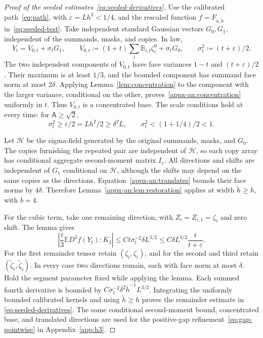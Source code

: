 \documentclass[11pt,letterpaper]{article}
\theoremstyle{remark}
\newcommand{\E}{\mathbb E}
\begin{document}
\begin{proof}[Proof of the seeded estimates~\eqref{eq:seeded-derivatives}]
Use the calibrated path~\eqref{eq:path}, with
\(\varepsilon=Lh^2<1/4\), and the rescaled function
\(f=F_{\widetilde a,\widetilde h}\) in~\eqref{eq:seeded-test}.
Take independent standard Gaussian vectors \(G_0,G_1\), independent
of the summands, masks, and copies. In law,
\begin{equation}
 Y_t=V_{0,t}+\sigma_tG_1,\qquad
 V_{0,t}\coloneqq(1+t)\sum_i\mathbb B_{i,t}\zeta_i^0+\sigma_tG_0,
 \qquad\sigma_t^2\coloneqq(t+\varepsilon)/2.
 \label{eq:seeded-gaussian-split}
\end{equation}
The two independent components of \(V_{0,t}\) have face variances
\(1-t\) and \((t+\varepsilon)/2\). Their maximum is at least
\(1/3\), and the bounded component has summand face norm at most
\(2\delta\). Applying Lemma~\ref{lem:concentration} to the
component with the larger variance, conditional on the other,
proves~\eqref{appx-an:concentration} uniformly in \(t\).
Thus \(V_{0,t}\) is a concentrated base. The scale conditions hold
at every time: for \(\mathsf A\ge\sqrt2\),
\[
 \sigma_t^2\ge\varepsilon/2=Lh^2/2\ge\delta^2L,
 \qquad \sigma_t^2<(1+1/4)/2<1.
\]

Let \(\mathcal H\) be the sigma-field generated by the original
summands, masks, and \(G_0\). The copies furnishing the repeated
pair are independent of \(\mathcal H\), so each copy array has
conditional aggregate second-moment matrix \(I_r\). All directions
and shifts are independent of \(G_1\) conditional on
\(\mathcal H\), although the shifts may depend on the same copies as the
directions. Equation~\eqref{appx-an:translates} bounds their face
norms by \(4\delta\). Therefore Lemma~\ref{appx-an:lem:restoration}
applies at width \(\widetilde h\ge h\), with \(b=4\).

For the cubic term, take one remaining direction, with
\(Z_i=Z_{i,1}=\zeta_i\) and zero shift. The lemma gives
\[
 \left|\frac t3\E D^3f(Y_t):K_3\right|
 \le Ct\sigma_t^{-2}\delta L^{3/2}
 \le C\delta L^{3/2}\frac{t}{t+\varepsilon}.
\]
For the first remainder tensor retain \((\zeta_i,\zeta_i)\), and
for the second and third retain
\((\widetilde\zeta_i,\widetilde\zeta_i)\). In every case two
directions remain, each with face norm at most \(\delta\).
Hold the segment parameter fixed while applying the lemma. Each
summed fourth derivative is bounded by
\(C\sigma_t^{-2}\delta^2\widetilde h^{-1}L^{3/2}\).
Integrating the uniformly bounded calibrated kernels and using
\(\widetilde h\ge h\) proves the remainder estimate in
\eqref{eq:seeded-derivatives}. The same conditional second-moment
bound, concentrated base, and translated directions are used for
the positive-gap refinement~\eqref{eq:gap-pointwise} in Appendix~\ref{app:h3}.
\end{proof}
\end{document}
